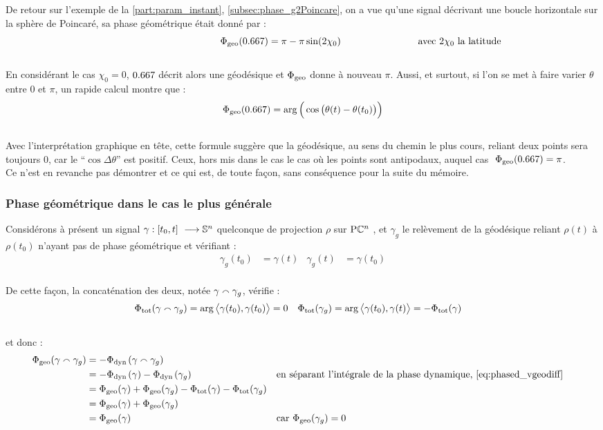 De retour sur l'exemple de la \cref{part:param_instant}, \cref{subsec:phase_g2Poincare}, on a vue qu'une signal décrivant une boucle horizontale sur la sphère de Poincaré, sa phase géométrique était donné par :
\[\qquad\qquad\qquad\qquad\qquad\qquad \phaseg(\x) = \pi - \pi\sin (2\chi_0) \qquad\qquad\qquad\qquad \text{avec $2\chi_0$ la latitude}\]
\\ 
En considérant le cas $\chi_0=0$, $\x$ décrit alors une géodésique et $\Phi_{\text{\normalfont geo}}$ donne à nouveau $\pi$. Aussi, et surtout, si l'on se met à faire varier $\theta$ entre $0$ et $\pi$, un rapide calcul montre que :
\[\phaseg(\x) = \arg\Big(\cos\big( \theta(t) - \theta(t_0) \big)\Big)\]
\\
Avec l’interprétation graphique en tête, cette formule suggère que la géodésique, au sens du chemin le plus cours, reliant deux points sera toujours 0, car le ``$\cos\Delta\theta$'' est positif. Ceux, hors mis dans le cas le cas où les points sont antipodaux, auquel cas $\ \phaseg(\x)=\pi$.
\\
Ce n'est en revanche pas démontrer et ce qui est, de toute façon, sans conséquence pour la suite du mémoire.
\\


\subsubsection{Phase géométrique dans le cas le plus générale}

Considérons à présent un signal $\gamma: [t_0,t]\ \longrightarrow \mathbb{ S}^{n}$ quelconque de projection $\rho$ sur $\text{\normalfont P}\mathbb{C}^{n}$ , et $\gamma_g$ le relèvement de la géodésique reliant $\rho(t)$ à $\rho(t_0)$ n'ayant pas de phase géométrique et vérifiant :
\begin{align*}
	\gamma_g(t_0) &= \gamma(t)  &  \gamma_g(t) &= \gamma(t_0)
\end{align*}
\\
De cette façon, la concaténation des deux, notée $\gamma \smallfrown \gamma_g$, vérifie :
\begin{align*}
	\Phi_{\text{\normalfont tot}}(\gamma \smallfrown \gamma_g) &= \arg\big\langle \gamma(t_0), \gamma(t_0) \big\rangle =0  &  \Phi_{\text{\normalfont tot}}(\gamma_g) &= \arg\big\langle \gamma(t_0), \gamma(t) \big\rangle = - \Phi_{\text{\normalfont tot}}(\gamma)
\end{align*}
\\
et donc :
\begin{align*}
	\Phi_{\text{\normalfont geo}}(\gamma  \smallfrown \gamma_g) &= -\Phi_{\text{\normalfont dyn}\, }(\gamma  \smallfrown \gamma_g) \\
	&= -\Phi_{\text{\normalfont dyn}\, }(\gamma) - \Phi_{\text{\normalfont dyn}\, }(\gamma_g)  &  &\text{en séparant l'intégrale de la phase dynamique, \eqref{eq:phased_vgeodiff}} \\
	&= \Phi_{\text{\normalfont geo}}(\gamma) + \Phi_{\text{\normalfont geo}}(\gamma_g) - \Phi_{\text{\normalfont tot}}(\gamma) - \Phi_{\text{\normalfont tot}}(\gamma_g) \\
	&= \Phi_{\text{\normalfont geo}}(\gamma) + \Phi_{\text{\normalfont geo}}(\gamma_g) \\
	&= \Phi_{\text{\normalfont geo}}(\gamma) & &\text{car }\Phi_{\text{\normalfont geo}}(\gamma_g) = 0
\end{align*}
\\

